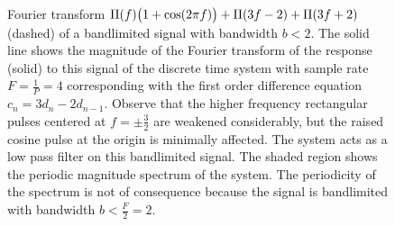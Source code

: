\begin{figure}[tp]
  \caption{Fourier transform $\Pi(f) \big(1 + \cos( 2 \pi f )\big) + \Pi(3f - 2) + \Pi(3f + 2)$ (dashed) of a bandlimited signal with bandwidth $b < 2$. The solid line shows the magnitude of the Fourier transform of the response (solid) to this signal of the discrete time system with sample rate $F = \tfrac{1}{P} = 4$ corresponding with the first order difference equation $c_n = 3 d_n - 2 d_{n-1}$.  Observe that the higher frequency rectangular pulses centered at $f = \pm \tfrac{3}{2}$ are weakened considerably, but the raised cosine pulse at the origin is minimally affected.  The system acts as a low pass filter on this bandlimited signal.  The shaded region shows the periodic magnitude spectrum of the system.  The periodicity of the spectrum is not of consequence because the signal is bandlimited with bandwidth $b < \tfrac{F}{2} = 2$.} \label{fig:bandlimiteddiscretetimefiltering}
\end{figure}

